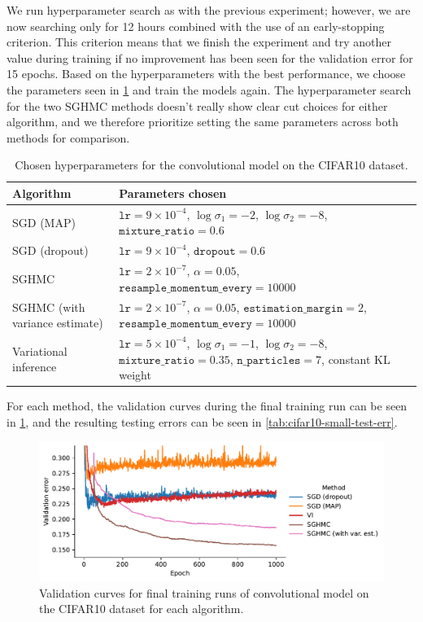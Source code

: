 We run hyperparameter search as with the previous experiment; however, we are now searching only for 12 hours combined with the use of an early-stopping criterion.
This criterion means that we finish the experiment and try another value during training if no improvement has been seen for the validation error for 15 epochs.
Based on the hyperparameters with the best performance, we choose the parameters seen in \cref{tab:cifar10-small-hparams} and train the models again. 
The hyperparameter search for the two SGHMC methods doesn't really show clear cut choices for either algorithm, and we therefore prioritize setting the same parameters across both methods for comparison. 
\begin{table}[htbp]
    \centering
    \begin{tabular}{p{4cm}p{9cm}}
        \toprule
        Algorithm & Parameters chosen \\ \midrule
        SGD (MAP) & 
        $\texttt{lr}=9 \times 10^{-4}$, 
        $\log\sigma_1=-2$, 
        $\log\sigma_2=-8$, 
        $\texttt{mixture\_ratio}=0.6$ \\ \midrule
        SGD (dropout) & $\texttt{lr}=9\times 10^{-4}$,
        $\texttt{dropout}=0.6$ \\ \midrule
        SGHMC & $\texttt{lr}=2\times 10^{-7}$, $\alpha=0.05$, $\texttt{resample\_momentum\_every}=10000$ \\ \midrule
        SGHMC (with variance estimate) &  $\texttt{lr}= 2 \times 10^{-7}$, 
        $\alpha=0.05$,
        $\texttt{estimation\_margin}=2$, $\texttt{resample\_momentum\_every}=10000$ \\  \midrule
        Variational inference &    
        $\texttt{lr}=5 \times 10^{-4}$,
        $\log\sigma_1=-1$,
        $\log\sigma_2=-8$,
        $\texttt{mixture\_ratio}=0.35$,
        $\texttt{n\_particles}=7$, constant KL weight \\
        \bottomrule
    \end{tabular}
    \caption{Chosen hyperparameters for the convolutional model on the CIFAR10 dataset.}
    \label{tab:cifar10-small-hparams}
\end{table}
For each method, the validation curves during the final training run can be seen in \cref{fig:cifar-small-final-runs-val}, and the resulting testing errors can be seen in \cref{tab:cifar10-small-test-err}.
\begin{figure}[htbp]
    \centering
    \includegraphics[width=\linewidth]{Figures/cifar-small-final-runs-val.pdf}    
    \caption{Validation curves for final training runs of convolutional model on the CIFAR10 dataset for each algorithm.}
    \label{fig:cifar-small-final-runs-val}
\end{figure}
